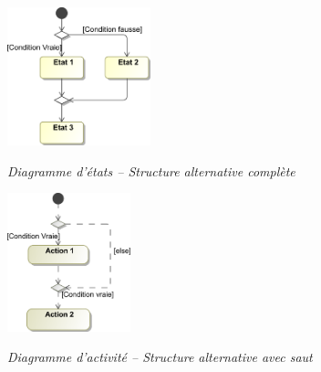 \documentclass[10pt,fleqn]{article} %
\begin{document}
\begin{minipage}[c]{.48\linewidth}
\begin{center}
\includegraphics[height=4cm]{images/Condition_stm}

\textit{Diagramme d'états -- Structure alternative complète}
\end{center}
\end{minipage} \hfill
\begin{minipage}[c]{.48\linewidth}
\begin{center}
\includegraphics[height=4cm]{images/Condition_act}

\textit{Diagramme d'activité -- Structure alternative avec saut}
\end{center}
\end{minipage}
\end{document}
